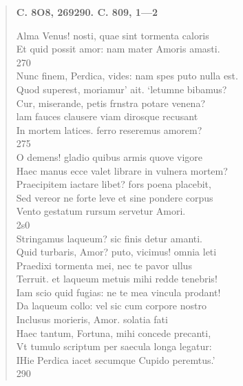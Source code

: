 \documentclass[11pt, a4paper]{report}
\begin{document}
\begin{verse}
    \begin{center} \textbf{C. 8O8, 269290. C. 809, 1—2} \end{center} \marginpar{[296]} Alma Venus! nosti, quae sint tormenta caloris \\ Et quid possit amor: nam mater Amoris amasti. \\ 270 \\ Nunc finem, Perdica, vides: nam spes puto nulla est. \\ Quod superest, moriamur’  \lbrack ait. \rbrack  ‘letumne bibamus? \\ Cur, miserande, petis frnstra potare venena? \\ lam fauces clausere viam dirosque recusant \\ In mortem latices. ferro reseremus amorem? \\ 275 \\ O demens! gladio quibus armis quove vigore \\ Haec manus ecce valet librare in vulnera mortem? \\ Praecipitem iactare libet? fors poena placebit, \\ Sed vereor ne forte leve et sine pondere corpus \\ Vento gestatum rursum servetur Amori. \\ 2s0 \\ Stringamus laqueum? sic finis detur amanti. \\ Quid turbaris, Amor? puto, vicimus! omnia leti \\ Praedixi tormenta mei, nec te pavor ullus \\ Terruit. et laqueum metuis mihi redde tenebris! \\ Iam scio quid fugias: ne te mea vincula prodant! \\ Da laqueum collo: vel sic cum corpore nostro \\ Inclusus morieris, Amor. solatia fati \\ Haec tantum, Fortuna, mihi concede precanti, \\ Vt tumulo scriptum per saecula longa legatur: \\ IHie Perdica iacet secumque Cupido peremtus.’ \\ 290 \\ 
      \end{verse}
  
\end{document}
